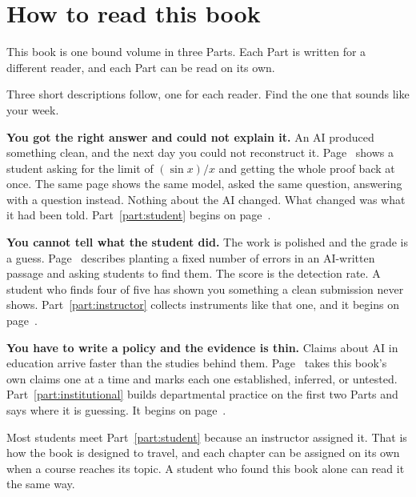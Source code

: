 \documentclass{SIAMbook2023}
\begin{document}

\section*{How to read this book}

This book is one bound volume in three Parts. Each Part is written for a different reader, and each Part can be read on its own.

Three short descriptions follow, one for each reader. Find the one that sounds like your week.

\textbf{You got the right answer and could not explain it.} An AI produced something clean, and the next day you could not reconstruct it. Page~\pageref{subsec:config-before-after} shows a student asking for the limit of $(\sin x)/x$ and getting the whole proof back at once. The same page shows the same model, asked the same question, answering with a question instead. Nothing about the AI changed. What changed was what it had been told. Part~\ref{part:student} begins on page~\pageref{part:student}.

\textbf{You cannot tell what the student did.} The work is polished and the grade is a guess. Page~\pageref{i:subsec:seeded-error-check} describes planting a fixed number of errors in an AI-written passage and asking students to find them. The score is the detection rate. A student who finds four of five has shown you something a clean submission never shows. Part~\ref{part:instructor} collects instruments like that one, and it begins on page~\pageref{part:instructor}.

\textbf{You have to write a policy and the evidence is thin.} Claims about AI in education arrive faster than the studies behind them. Page~\pageref{u:tab:evidence-status} takes this book's own claims one at a time and marks each one established, inferred, or untested. Part~\ref{part:institutional} builds departmental practice on the first two Parts and says where it is guessing. It begins on page~\pageref{part:institutional}.

Most students meet Part~\ref{part:student} because an instructor assigned it. That is how the book is designed to travel, and each chapter can be assigned on its own when a course reaches its topic. A student who found this book alone can read it the same way.
\end{document}
